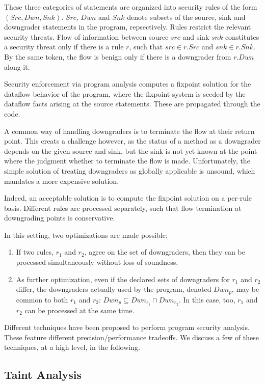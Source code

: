 These three categories of statements are organized into security rules of the form $\left( Src,Dwn,Snk \right)$. $Src$, $Dwn$ and $Snk$ denote subsets of the source, sink and downgrader statements in the program, repsectively. Rules restrict the relevant security threats. Flow of information between source $src$ and sink $snk$ constitutes a security threat only if there is a rule $r$, such that $src \in r.Src$ and $snk \in r.Snk$. By the same token, the flow is benign only if there is a downgrader from $r.Dwn$ along it. 

Security enforcement via program analysis computes a fixpoint solution for the dataflow behavior of the program, where the fixpoint system is seeded by the dataflow facts arising at the source statements. These are propagated through the code.

A common way of handling downgraders is to terminate the flow at their return point. This creats a challenge however, as the status of a method as a downgrader depends on the given source and sink, but the sink is not yet known at the point where the judgment whether to terminate the flow is made. Unfortunately, the simple solution of treating downgraders as globally applicable is unsound, which mandates a more expensive solution.

Indeed, an acceptable solution is to compute the fixpoint solution on a per-rule basis. Different rules are processed separately, such that flow termination at downgrading points is conservative. 

In this setting, two optimizations are made possible:
\begin{enumerate}
	\item If two rules, $r_1$ and $r_2$, agree on the set of downgraders, then they can be processed simultaneously without loss of soundness.
	\item As further optimization, even if the declared sets of downgraders for $r_1$ and $r_2$ differ, the downgraders actually used by the program, denoted $Dwn_p$, may be common to both $r_1$ and $r_2$: $Dwn_p \subseteq Dwn_{r_1} \cap Dwn_{r_2}$. In this case, too, $r_1$ and $r_2$ can be processed at the same time.
\end{enumerate}

Different techniques have been proposed to perform program security analysis. These feature different precision/performance tradeoffs. We discuss a few of these techniques, at a high level, in the following.

\subsection{Taint Analysis}

